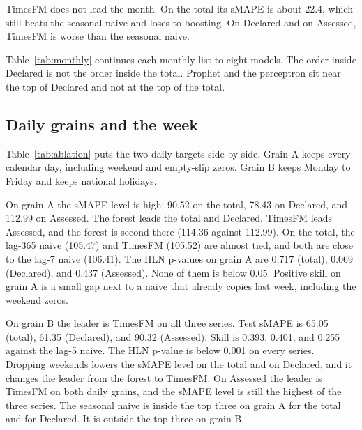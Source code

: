TimesFM does not lead the month.
On the total its sMAPE is about 22.4, which still beats the seasonal naive and loses to boosting.
On Declared and on Assessed, TimesFM is worse than the seasonal naive.

Table~\ref{tab:monthly} continues each monthly list to eight models.
The order inside Declared is not the order inside the total.
Prophet and the perceptron sit near the top of Declared and not at the top of the total.

\begin{table}[t]
  \caption{Monthly grain: eight lowest test sMAPE values on each series.}
  \label{tab:monthly}
  \centering
  \small
  
\end{table}

\subsection{Daily grains and the week}
\label{sec:ablation}

Table~\ref{tab:ablation} puts the two daily targets side by side.
Grain A keeps every calendar day, including weekend and empty-slip zeros.
Grain B keeps Monday to Friday and keeps national holidays.

On grain A the sMAPE level is high: 90.52 on the total, 78.43 on Declared, and 112.99 on Assessed.
The forest leads the total and Declared.
TimesFM leads Assessed, and the forest is second there (114.36 against 112.99).
On the total, the lag-365 naive (105.47) and TimesFM (105.52) are almost tied, and both are close to the lag-7 naive (106.41).
The HLN p-values on grain A are 0.717 (total), 0.069 (Declared), and 0.437 (Assessed).
None of them is below 0.05.
Positive skill on grain A is a small gap next to a naive that already copies last week, including the weekend zeros.

On grain B the leader is TimesFM on all three series.
Test sMAPE is 65.05 (total), 61.35 (Declared), and 90.32 (Assessed).
Skill is 0.393, 0.401, and 0.255 against the lag-5 naive.
The HLN p-value is below 0.001 on every series.
Dropping weekends lowers the sMAPE level on the total and on Declared, and it changes the leader from the forest to TimesFM.
On Assessed the leader is TimesFM on both daily grains, and the sMAPE level is still the highest of the three series.
The seasonal naive is inside the top three on grain A for the total and for Declared.
It is outside the top three on grain B.

\begin{table}[ht]
  \caption{Three lowest test sMAPE values on grain A and on grain B.}
  \label{tab:ablation}
  \centering
  \scriptsize
  
\end{table}


